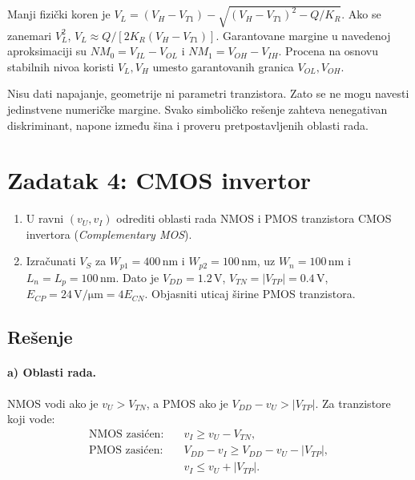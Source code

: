 \documentclass[a4paper,11pt]{article}
\numberwithin{equation}{section}
\newcommand{\napomena}[1]{\begin{tcolorbox}[colback=gray!10,colframe=black,boxrule=0.5pt,breakable]#1\end{tcolorbox}}
\begin{document}
Manji fizički koren je $V_L=(V_H-V_{T1})-\sqrt{(V_H-V_{T1})^2-Q/K_R}$. Ako se zanemari $V_L^2$, $V_L\approx Q/[2K_R(V_H-V_{T1})]$.
Garantovane margine u navedenoj aproksimaciji su $NM_0=V_{IL}-V_{OL}$ i $NM_1=V_{OH}-V_{IH}$. Procena na osnovu stabilnih nivoa koristi $V_L,V_H$ umesto garantovanih granica $V_{OL},V_{OH}$.
\napomena{Nisu dati napajanje, geometrije ni parametri tranzistora. Zato se ne mogu navesti jedinstvene numeričke margine. Svako simboličko rešenje zahteva nenegativan diskriminant, napone između šina i proveru pretpostavljenih oblasti rada.}
\clearpage\section{Zadatak 4: CMOS invertor}\label{sec:4}
\begin{enumerate}[label=\alph*)]
\item U ravni $(v_U,v_I)$ odrediti oblasti rada NMOS i PMOS tranzistora CMOS invertora (\emph{Complementary MOS}).
\item Izračunati $V_S$ za $W_{p1}=400\,\mathrm{nm}$ i $W_{p2}=100\,\mathrm{nm}$, uz $W_n=100\,\mathrm{nm}$ i $L_n=L_p=100\,\mathrm{nm}$. Dato je $V_{DD}=1.2\,\mathrm V$, $V_{TN}=|V_{TP}|=0.4\,\mathrm V$, $E_{CP}=24\,\mathrm{V/\mu m}=4E_{CN}$. Objasniti uticaj širine PMOS tranzistora.
\end{enumerate}
\FloatBarrier{}\subsection*{Rešenje}
\FloatBarrier{}\paragraph{a) Oblasti rada.}
NMOS vodi ako je $v_U>V_{TN}$, a PMOS ako je $V_{DD}-v_U>|V_{TP}|$. Za tranzistore koji vode:
\begin{equation}\label{eq:4.1}
\begin{aligned}\text{NMOS zasićen:}\quad&v_I\ge v_U-V_{TN},\\\text{PMOS zasićen:}\quad&V_{DD}-v_I\ge V_{DD}-v_U-|V_{TP}|,\\&v_I\le v_U+|V_{TP}|.\end{aligned}
\end{equation}
\end{document}
